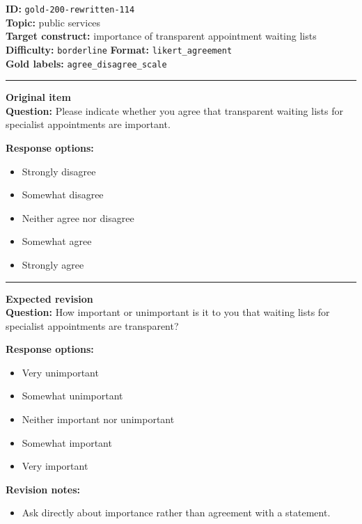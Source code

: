 \documentclass[10pt,a4paper]{article}
\newcommand{\sectionline}{\vspace{0.15em}\hrule\vspace{0.35em}}
\begin{document}
\begin{tcolorbox}[colframe=FlawRed,colback=white,colbacktitle=FlawRed!9,coltitle=black,title={Item 114\hfill Flawed item}]
\textbf{ID:} \texttt{gold-200-rewritten-114}\\
\textbf{Topic:} public services\\
\textbf{Target construct:} importance of transparent appointment waiting lists\\
\textbf{Difficulty:} \texttt{borderline} \quad \textbf{Format:} \texttt{likert\_agreement}\\
\textbf{Gold labels:} \texttt{agree\_disagree\_scale}\\
\sectionline
\textbf{Original item}\\
\textbf{Question:} Please indicate whether you agree that transparent waiting lists for specialist appointments are important.
\par\textbf{Response options:}
\begin{itemize}
\item Strongly disagree
\item Somewhat disagree
\item Neither agree nor disagree
\item Somewhat agree
\item Strongly agree
\end{itemize}
\sectionline
\textbf{Expected revision}\\
\textbf{Question:} How important or unimportant is it to you that waiting lists for specialist appointments are transparent?
\par\textbf{Response options:}
\begin{itemize}
\item Very unimportant
\item Somewhat unimportant
\item Neither important nor unimportant
\item Somewhat important
\item Very important
\end{itemize}
\par\textbf{Revision notes:}
\begin{itemize}
\item Ask directly about importance rather than agreement with a statement.
\end{itemize}
\end{tcolorbox}
\end{document}
